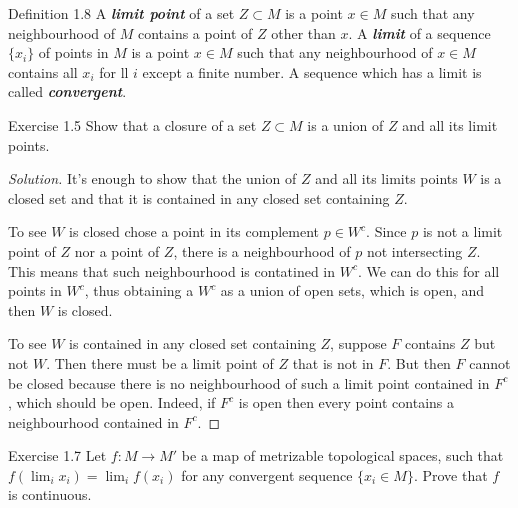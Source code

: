 \begin{thing3}{Definition 1.8}\leavevmode
	A \textit{\textbf{limit point}} of a set  $Z \subset M$ is a point $x \in M$ such that any neighbourhood of $M$ contains a point of $Z$ other than $x$. A \textit{\textbf{limit}} of a sequence $\{ x_i\}$ of points in $M$ is a point $x \in M$ such that any neighbourhood of  $x \in M$ contains all $x_i$ for ll $i$ except a finite number. A sequence which has a limit is called \textit{\textbf{convergent}}.
\end{thing3}

\begin{thing4}{Exercise 1.5}\label{exer:1.5}\leavevmode
	Show that a closure of a set $Z \subset M$ is a union of $Z$ and all its limit points.
\end{thing4}

\begin{proof}[Solution]\leavevmode
	It's enough to show that the union of $Z$ and all its limits points $W$ is a closed set and that it is contained in any closed set containing $Z$.

	To see $W$ is closed chose a point in its complement $p \in W^c$. Since $p$ is not a limit point of $Z$ nor a point of $Z$, there is a neighbourhood of $p$ not intersecting $Z$. This means that such neighbourhood is contatined in $W^c$. We can do this for all points in $W^c$, thus obtaining a $W^c$ as a union of open sets, which is open, and then $W$ is closed.

	To see $W$ is contained in any closed set containing $Z$, suppose $F$ contains $Z$ but not $W$. Then there must be a limit point of $Z$ that is not in $F$. But then $F$ cannot be closed because there is no neighbourhood of such a limit point contained in $F^c$, which should be open. {\color{2}Indeed, if $F^c$ is open then every point contains a neighbourhood contained in $F^c$.}
\end{proof}

\begin{thing4}{Exercise 1.7}\label{exer:1.7}\leavevmode
Let $f:M\to M'$ be a map of metrizable topological spaces, such that $f \left( \lim_{i} x_i \right) =\lim_{i} f(x_i)$ for any convergent sequence $\{x_i \in M\}$. Prove that $f$ is continuous.	
\end{thing4}

